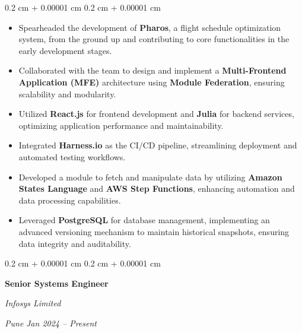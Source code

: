 \documentclass[10pt, letterpaper]{article}
\newenvironment{highlights}{
    \begin{itemize}[
        topsep=0.10 cm,
        parsep=0.10 cm,
        partopsep=0pt,
        itemsep=0pt,
        leftmargin=0.4 cm + 10pt
    ]
}{
    \end{itemize}
}
\newenvironment{onecolentry}{
    \begin{adjustwidth}{
        0.2 cm + 0.00001 cm
    }{
        0.2 cm + 0.00001 cm
    }
}{
    \end{adjustwidth}
}
\newenvironment{twocolentry}[2][]{
    \onecolentry
    \def\secondColumn{#2}
    \setcolumnwidth{\fill, 4.5 cm}
    \begin{paracol}{2}
}{
    \switchcolumn \raggedleft \secondColumn
    \end{paracol}
    \endonecolentry
}
\begin{document}
    \vspace{0.10 cm}
    \begin{onecolentry}
         \begin{highlights}
            \item Spearheaded the development of \textbf{Pharos}, a flight schedule optimization system, from the ground up and contributing to core functionalities in the early development stages.
            \item Collaborated with the team to design and implement a \textbf{Multi-Frontend Application (MFE)} architecture using \textbf{Module Federation}, ensuring scalability and modularity.
            \item Utilized \textbf{React.js} for frontend development and \textbf{Julia} for backend services, optimizing application performance and maintainability.
            \item Integrated \textbf{Harness.io} as the CI/CD pipeline, streamlining deployment and automated testing workflows.
            \item Developed a module to fetch and manipulate data by utilizing \textbf{Amazon States Language} and \textbf{AWS Step Functions}, enhancing automation and data processing capabilities.
            \item Leveraged \textbf{PostgreSQL} for database management, implementing an advanced versioning mechanism to maintain historical snapshots, ensuring data integrity and auditability.
        \end{highlights}
    \end{onecolentry}

    \vspace{0.2 cm}
        \begin{twocolentry}{
        \textit{Pune}    
        \textit{Jan 2024 – Present}}
            \textbf{Senior Systems Engineer}
            
            \textit{Infosys Limited}
        \end{twocolentry}
\end{document}
